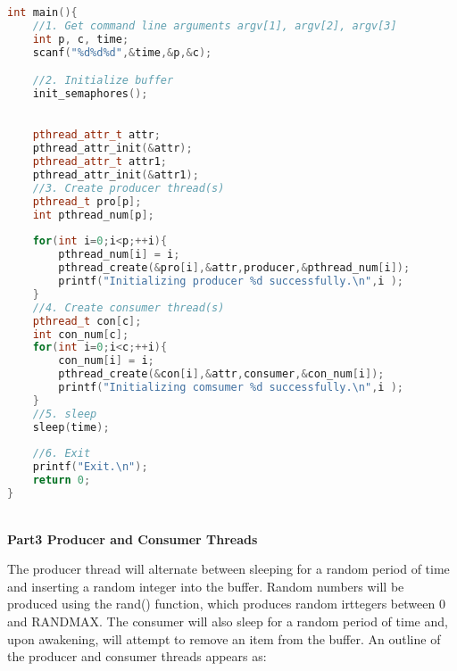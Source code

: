 \documentclass[12pt,a4paper]{article}
\begin{document}
\begin{lstlisting}[language=C++]
int main(){
	//1. Get command line arguments argv[1], argv[2], argv[3]
	int p, c, time;
	scanf("%d%d%d",&time,&p,&c);

	//2. Initialize buffer	
	init_semaphores();
	

	pthread_attr_t attr;
	pthread_attr_init(&attr);
	pthread_attr_t attr1;
	pthread_attr_init(&attr1);
	//3. Create producer thread(s)
	pthread_t pro[p];
	int pthread_num[p];
	
	for(int i=0;i<p;++i){
		pthread_num[i] = i;
		pthread_create(&pro[i],&attr,producer,&pthread_num[i]);
		printf("Initializing producer %d successfully.\n",i );
	}
	//4. Create consumer thread(s)
	pthread_t con[c];
	int con_num[c];
	for(int i=0;i<c;++i){
		con_num[i] = i;
		pthread_create(&con[i],&attr,consumer,&con_num[i]);
		printf("Initializing comsumer %d successfully.\n",i );
	}	
	//5. sleep
	sleep(time);
	
	//6. Exit
	printf("Exit.\n");	
	return 0;
}
\end{lstlisting}

~\\
\textbf{Part3 Producer and Consumer Threads }

The producer thread will alternate between sleeping for a random period of time and inserting a random integer into the buffer. Random numbers will
be produced using the rand() function, which produces random irttegers between 0 and RANDMAX. The consumer will also sleep for a random period of time and, upon awakening, will attempt to remove an item from the buffer. An outline of the producer and consumer threads appears as:
\end{document}
